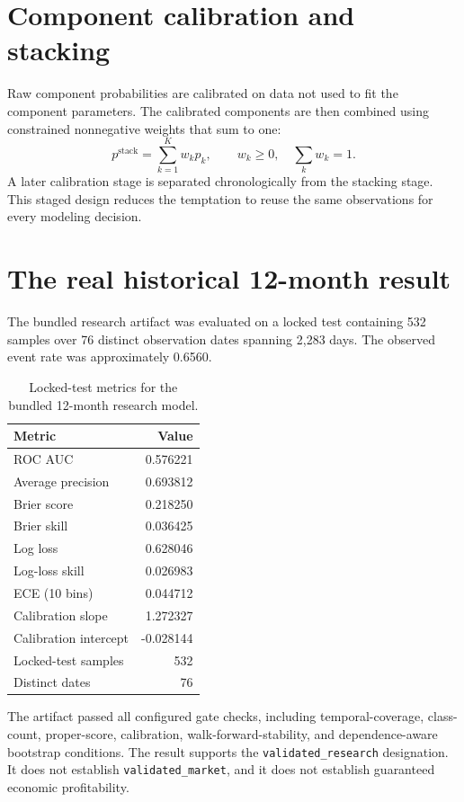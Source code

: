 \documentclass[11pt]{article}
\begin{document}
\section{Component calibration and stacking}

Raw component probabilities are calibrated on data not used to fit the component parameters. The calibrated components are then combined using constrained nonnegative weights that sum to one:
\begin{equation}
p^{\text{stack}}=\sum_{k=1}^{K}w_k p_k,\qquad w_k\ge0,\quad \sum_k w_k=1.
\end{equation}
A later calibration stage is separated chronologically from the stacking stage. This staged design reduces the temptation to reuse the same observations for every modeling decision.

\section{The real historical 12-month result}

The bundled research artifact was evaluated on a locked test containing 532 samples over 76 distinct observation dates spanning 2,283 days. The observed event rate was approximately 0.6560.

\begin{table}[H]
\centering
\small
\caption{Locked-test metrics for the bundled 12-month research model.}
\label{tab:realmetricsguide}
\begin{tabular}{@{}lr@{}}
\toprule
Metric & Value \\
\midrule
ROC AUC & 0.576221 \\
Average precision & 0.693812 \\
Brier score & 0.218250 \\
Brier skill & 0.036425 \\
Log loss & 0.628046 \\
Log-loss skill & 0.026983 \\
ECE (10 bins) & 0.044712 \\
Calibration slope & 1.272327 \\
Calibration intercept & -0.028144 \\
Locked-test samples & 532 \\
Distinct dates & 76 \\
\bottomrule
\end{tabular}
\end{table}

The artifact passed all configured gate checks, including temporal-coverage, class-count, proper-score, calibration, walk-forward-stability, and dependence-aware bootstrap conditions. The result supports the \texttt{validated\_research} designation. It does not establish \texttt{validated\_market}, and it does not establish guaranteed economic profitability.
\end{document}
